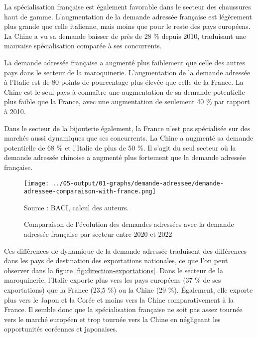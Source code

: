 \documentclass[french,10pt,a4paper]{article}
\begin{document}
La spécialisation française est également favorable dans le secteur des chaussures haut de gamme. L'augmentation de la demande adressée française est légèrement plus grande que celle italienne, mais moins que pour le reste des pays européens. La Chine a vu sa demande baisser de près de 28 \% depuis 2010, traduisant une mauvaise spécialisation comparée à ses concurrents.

La demande adressée française a augmenté plus faiblement que celle des autres pays dans le secteur de la maroquinerie. L'augmentation de la demande adressée à l'Italie est de 80 points de pourcentage plus élevée que celle de la France. La Chine est le seul pays à connaître une augmentation de sa demande potentielle plus faible que la France, avec une augmentation de seulement 40 \% par rapport à 2010.

Dans le secteur de la bijouterie également, la France n'est pas spécialisée sur des marchés aussi dynamiques que ses concurrents. La Chine a augmenté sa demande potentielle de 68 \% et l'Italie de plus de 50 \%. Il s'agit du seul secteur où la demande adressée chinoise a augmenté plus fortement que la demande adressée française. 


\begin{figure}[!h]
  \centering
  \texttt{[image: ../05-output/01-graphs/demande-adressee/demande-adressee-comparaison-with-france.png]}
  \captionsetup{justification=raggedright,singlelinecheck=false, font=small}
  \caption*{Source : BACI, calcul des auteurs.}
  \captionsetup{justification=centering, singlelinecheck=true, font=normalsize}
  \caption{Comparaison de l'évolution des demandes adressées avec la demande adressée française par secteur entre 2020 et 2022}
  \label{fig:demande-adressee}
\end{figure}

\bigskip

Ces différences de dynamique de la demande adressée traduisent des différences dans les pays de destination des exportations nationales, ce que l'on peut observer dans la figure \ref{fig:direction-exportations}. Dans le secteur de la maroquinerie, l'Italie exporte plus vers les pays européens (37 \% de ses exportations) que la France (23,5 \%) ou la Chine (29 \%). Également, elle exporte plus vers le Japon et la Corée et moins vers la Chine comparativement à la France. Il semble donc que la spécialisation française ne soit pas assez tournée vers le marché européen et trop tournée vers la Chine en négligeant les opportunités coréennes et japonaises.
\end{document}
